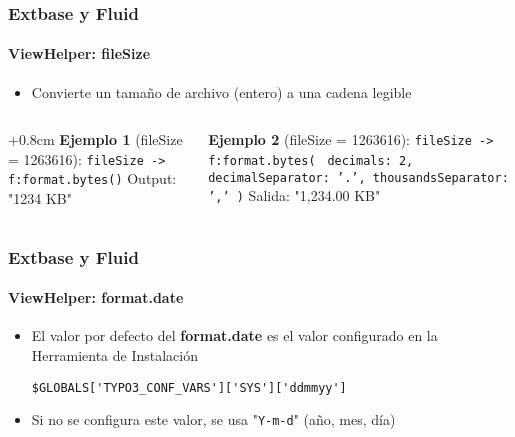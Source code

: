 \begin{frame}[fragile]
	\frametitle{Extbase y Fluid}
	\framesubtitle{ViewHelper: fileSize}

	\begin{itemize}
		\item Convierte un tamaño de archivo (entero) a una cadena legible\newline
	\end{itemize}

	\begin{columns}[T]

		\begin{column}{.5\textwidth}
			\advance\leftskip+0.8cm
			\smaller
				\textbf{Ejemplo 1} (fileSize = 1263616):\newline
				\texttt{fileSize -> f:format.bytes()}\newline
				\newline
				Output: "1234 KB"
			\normalsize
		\end{column}
		\begin{column}{.5\textwidth}
			\smaller
				\textbf{Ejemplo 2} (fileSize = 1263616):\newline
				\texttt{fileSize -> f:format.bytes(}\newline
				\texttt{
				decimals: 2,\newline
				decimalSeparator: '.',\newline
				thousandsSeparator: ','\newline
				)}\newline
				\newline
				Salida: "1,234.00 KB"
			\normalsize
		\end{column}

	\end{columns}

\end{frame}


\begin{frame}[fragile]
	\frametitle{Extbase y Fluid}
	\framesubtitle{ViewHelper: format.date}

	\lstset{
		basicstyle=\smaller\ttfamily
	}

	\begin{itemize}
		\item El valor por defecto del \textbf{format.date} es el valor configurado en la Herramienta de Instalación

			\lstinline!$GLOBALS['TYPO3_CONF_VARS']['SYS']['ddmmyy']!

		\item Si no se configura este valor, se usa "\texttt{Y-m-d}" (año, mes, día)

	\end{itemize}

\end{frame}

